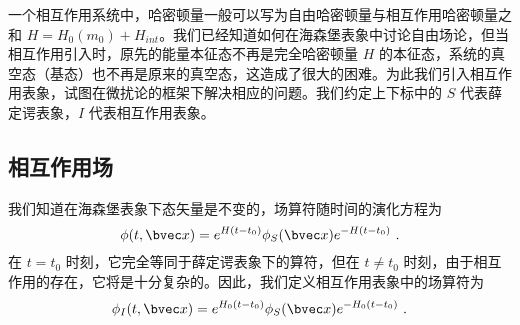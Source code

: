 
一个相互作用系统中，哈密顿量一般可以写为自由哈密顿量与相互作用哈密顿量之和 $H=H_0(m_0)+H_{int}$。我们已经知道如何在海森堡表象中讨论自由场论，但当相互作用引入时，原先的能量本征态不再是完全哈密顿量 $H$ 的本征态，系统的真空态（基态）也不再是原来的真空态，这造成了很大的困难。为此我们引入相互作用表象，试图在微扰论的框架下解决相应的问题。我们约定上下标中的 $S$ 代表薛定谔表象，$I$ 代表相互作用表象。
\subsection{相互作用场}
我们知道在海森堡表象下态矢量是不变的，场算符随时间的演化方程为
\begin{equation}
\phi(t,\bvec x)=e^{H(t-t_0)}\phi_S(\bvec x)e^{-H(t-t_0)}~.
\end{equation}
在 $t=t_0$ 时刻，它完全等同于薛定谔表象下的算符，但在 $t\neq t_0$ 时刻，由于相互作用的存在，它将是十分复杂的。因此，我们定义相互作用表象中的场算符为
\begin{equation}
\phi_I(t,\bvec x)=e^{H_0(t-t_0)}\phi_S(\bvec x)e^{-H_0(t-t_0)}~.
\end{equation}


